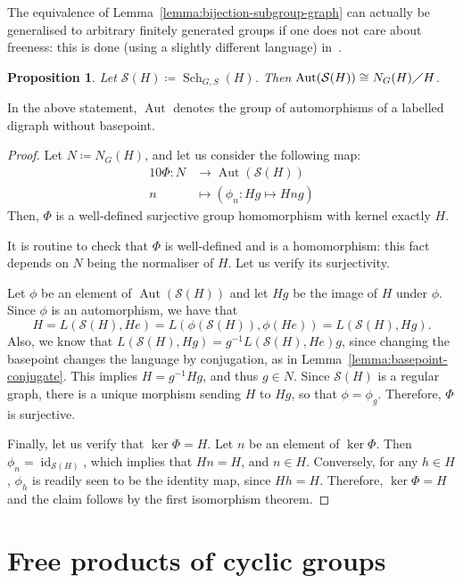 \documentclass[10pt,a4paper]{amsart}
\newtheorem{prop}[theo]{Proposition}
\theoremstyle{definition}
\newcommand{\cS}{\mathcal{S}}
\DeclareMathOperator{\Sch}{Sch}
\DeclareMathOperator{\aut}{Aut}
\DeclareMathOperator{\id}{id}
\begin{document}
The equivalence of Lemma~\ref{lemma:bijection-subgroup-graph} can actually be generalised to arbitrary finitely generated groups if one does not care about freeness: this is done (using a slightly different language) in~\cite[Theorem~3.5]{We}.

\begin{prop}\label{lemma:N-over-H-as-auto}
Let $\cS(H) \coloneqq \Sch_{G,S}(H)$. Then $\aut(\cS(H)) \cong N_G(H)\diagup H$.
\end{prop}

In the above statement, $\aut$ denotes the group of automorphisms of a labelled digraph without basepoint.

\begin{proof}
Let $N \coloneqq N_G(H)$, and let us consider the following map:
\begin{alignat*}{10}
\Phi : N &\longrightarrow \aut(\cS(H))\\
n &\longmapsto \left( \phi_n : Hg \mapsto Hng \right)
\end{alignat*}
Then, $\Phi$ is a well-defined surjective group homomorphism with kernel exactly $H$. 

It is routine to check that $\Phi$ is well-defined and is a homomorphism: this fact depends on $N$ being the normaliser of $H$. Let us verify its surjectivity. 

Let $\phi$ be an element of $\aut(\cS(H))$ and let $Hg$ be the image of $H$ under $\phi$.
Since ${\phi}$ is an automorphism, we have that
\[
 H = L(\cS(H),He) = L({\phi}(\cS(H)),{\phi}(He)) = L(\cS(H),Hg).
\]
Also, we know that $L(\cS(H),Hg) = g^{-1}L(\cS(H),He)g$, since changing the basepoint changes the language by conjugation, as in Lemma~\ref{lemma:basepoint-conjugate}. This implies $H = g^{-1}Hg$, and thus $g\in N$. Since $\cS(H)$ is a regular graph, there is a unique morphism sending $H$ to $Hg$, so that $\phi=\phi_g$. Therefore, $\Phi$ is surjective.

Finally, let us verify that $\ker {\Phi} = H$. Let $n$ be an element of $\ker \Phi$. Then $\phi_n = \id _{\cS(H)}$, which implies that $Hn = H$, and $n\in H$.
Conversely, for any $h \in H$, ${\phi}_h$ is readily seen to be the identity map, since $Hh = H$. Therefore, $\ker {\Phi} = H$ and the claim follows by the first isomorphism theorem.
\end{proof}

\section{Free products of cyclic groups}
\end{document}

